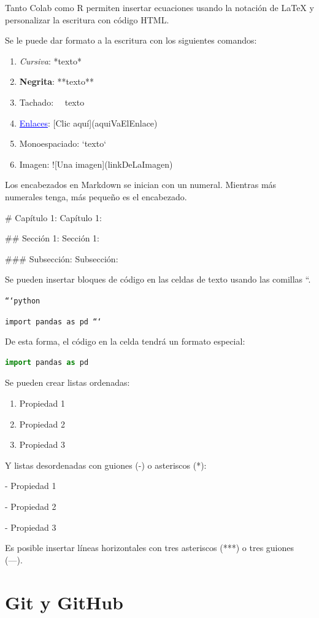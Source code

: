 \documentclass[a4paper, 12pt]{book}
\begin{document}
Tanto Colab como R permiten insertar ecuaciones usando la notación de LaTeX y personalizar la escritura con código HTML.


Se le puede dar formato a la escritura con los siguientes comandos:
\begin{enumerate}
	\item \textit{Cursiva}: *texto*
	\item \textbf{Negrita}: **texto**
	\item Tachado: ~~texto~~
	\item \textcolor{blue}{\underline{Enlaces}}: [Clic aquí](aquiVaElEnlace)
	\item Monoespaciado: `texto`
	\item Imagen: ![Una imagen](linkDeLaImagen)
\end{enumerate}

Los encabezados en Markdown se inician con un numeral. Mientras más numerales tenga, más pequeño es el encabezado.

$\#$ Capítulo 1: {\LARGE Capítulo 1:}

$\#\#$ Sección 1: {\Large Sección 1:}

$\#\#\#$ Subsección: {\large Subsección:}

Se pueden insertar bloques de código en las celdas de texto usando las comillas ``.

\texttt{```python}
	
\texttt{import pandas as pd
	```}

De esta forma, el código en la celda tendrá un formato especial:
\begin{lstlisting}[language=Python]
	import pandas as pd
\end{lstlisting}


Se pueden crear listas ordenadas:
\begin{enumerate}
	\item Propiedad 1
	\item Propiedad 2
	\item Propiedad 3
\end{enumerate}
Y listas desordenadas con guiones (-) o asteriscos (*):

- Propiedad 1

- Propiedad 2

- Propiedad 3


Es posible insertar líneas horizontales con tres asteriscos (***) o tres guiones (---).


%
\chapter{Git y GitHub}
\end{document}
